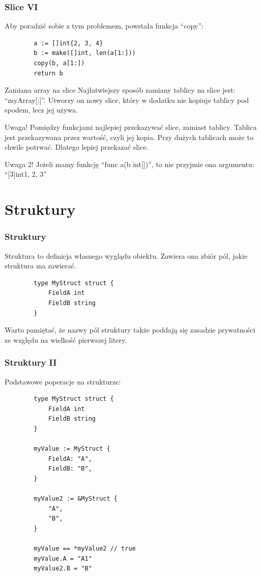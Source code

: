 \documentclass[10pt]{beamer}
\newcommand{\quotes}[1]{``#1''}
\begin{document}
\begin{frame}[fragile]
    \frametitle{Slice VI}
    Aby poradzić sobie z tym problemem, powstała funkcja \quotes{copy}:
    \begin{verbatim}
        a := []int{2, 3, 4}
        b := make([]int, len(a[1:]))
        copy(b, a[1:])
        return b
    \end{verbatim}

    \begin{block}{Zamiana array na slice}
        Najłatwiejszy sposób zamiany tablicy na slice jest: \quotes{myArray[:]}.
        Utworzy on nowy slice, który w dodatku nie kopiuje tablicy pod spodem, lecz
        jej używa.
    \end{block}

    \begin{alertblock}{Uwaga!}
        Pomiędzy funkcjami najlepiej przekazywać slice, zamiast tablicy. Tablica
        jest przekazywana przez wartość, czyli jej kopia. Przy dużych tablicach
        może to chwile potrwać. Dlatego lepiej przekazać slice. 
    \end{alertblock}

    \begin{alertblock}{Uwaga 2!}
        Jeżeli mamy funkcję \quotes{func a(b int[])}, to nie przyjmie ona argumentu:
        \quotes{[3]int{1, 2, 3}}
    \end{alertblock}
\end{frame}


\section[Struktury]{Struktury}
\begin{frame}[fragile]
    \frametitle{Struktury}
    Struktura to definicja własnego wyglądu obiektu. Zawiera ona zbiór pól, jakie
    struktura ma zawierać.

    \begin{verbatim}
        type MyStruct struct {
            FieldA int
            FieldB string
        }
    \end{verbatim}

    Warto pamiętać, że nazwy pól struktury także poddają się zasadzie prywatności ze
    względu na wielkość pierwszej litery.
\end{frame}

\begin{frame}[fragile]
    \frametitle{Struktury II} 
    Podstawowe poperacje na strukturze:

    \begin{verbatim}
        type MyStruct struct {
            FieldA int
            FieldB string
        }

        myValue := MyStruct {
            FieldA: "A",
            FieldB: "B",
        }

        myValue2 := &MyStruct {
            "A",
            "B",
        }

        myValue == *myValue2 // true
        myValue.A = "A1"
        myValue2.B = "B"
    \end{verbatim}
\end{frame}
\end{document}
